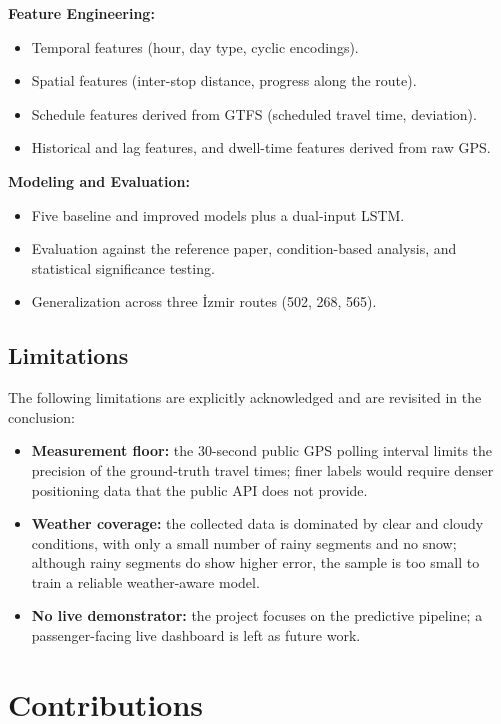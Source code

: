 \textbf{Feature Engineering:}
\begin{itemize}
    \item Temporal features (hour, day type, cyclic encodings).
    \item Spatial features (inter-stop distance, progress along the route).
    \item Schedule features derived from GTFS (scheduled travel time, deviation).
    \item Historical and lag features, and dwell-time features derived from raw GPS.
\end{itemize}

\textbf{Modeling and Evaluation:}
\begin{itemize}
    \item Five baseline and improved models plus a dual-input LSTM.
    \item Evaluation against the reference paper, condition-based analysis, and statistical significance testing.
    \item Generalization across three İzmir routes (502, 268, 565).
\end{itemize}

\subsection{Limitations}

The following limitations are explicitly acknowledged and are revisited in the conclusion:

\begin{itemize}
    \item \textbf{Measurement floor:} the 30-second public GPS polling interval limits the precision of the ground-truth travel times; finer labels would require denser positioning data that the public API does not provide.
    \item \textbf{Weather coverage:} the collected data is dominated by clear and cloudy conditions, with only a small number of rainy segments and no snow; although rainy segments do show higher error, the sample is too small to train a reliable weather-aware model.
    \item \textbf{No live demonstrator:} the project focuses on the predictive pipeline; a passenger-facing live dashboard is left as future work.
\end{itemize}

\section{Contributions}

